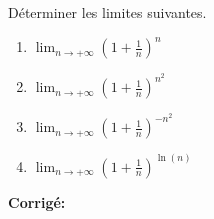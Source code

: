 \documentclass[a4paper,twoside,french,10pt]{VcCours}
\newcommand{\corr}{\textbf{Corrigé:}}
\begin{document}
\medskip

\begin{Exercice}{} Déterminer les limites suivantes. 

\begin{multicols}{2}
\begin{enumerate}
\item $\lim_{n \rightarrow + \infty} \left(1+ \frac{1}{n}\right)^n$
\item $\lim_{n \rightarrow + \infty} \left(1+ \frac{1}{n}\right)^{n^2}$
\columnbreak
\item $\lim_{n \rightarrow + \infty} \left(1+ \frac{1}{n}\right)^{-n^2}$
\item $\lim_{n \rightarrow + \infty} \left(1+ \frac{1}{n}\right)^{\ln(n)}$
\end{enumerate}
\end{multicols}
\vspace{0.1cm}
\end{Exercice} 

\corr
\end{document}
